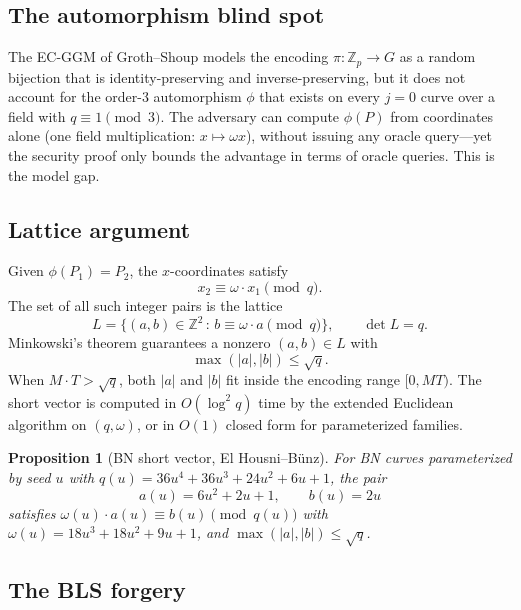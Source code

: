 \documentclass[11pt,a4paper]{article}
\newtheorem{proposition}[theorem]{Proposition}
\theoremstyle{definition}
\newcommand{\Z}{\mathbb{Z}}
\begin{document}
\subsection{The automorphism blind spot}

The EC-GGM of Groth–Shoup models the encoding $\pi : \Z_p \to G$ as a random
bijection that is identity-preserving and inverse-preserving, but it does
not account for the order-3 automorphism $\phi$ that exists on every $j=0$
curve over a field with $q \equiv 1 \pmod 3$. The adversary can compute
$\phi(P)$ from coordinates alone (one field multiplication: $x \mapsto \omega
x$), without issuing any oracle query—yet the security proof only bounds
the advantage in terms of oracle queries. This is the model gap.

\subsection{Lattice argument}

Given $\phi(P_1) = P_2$, the $x$-coordinates satisfy
\[
  x_2 \equiv \omega \cdot x_1 \pmod q.
\]
The set of all such integer pairs is the lattice
\[
  L = \{(a,b) \in \Z^2 \,:\, b \equiv \omega\cdot a \pmod q\},
  \qquad \det L = q.
\]
Minkowski's theorem guarantees a nonzero $(a,b) \in L$ with
\[
  \max(|a|,|b|) \le \sqrt{q}.
\]
When $M \cdot T > \sqrt{q}$, both $|a|$ and $|b|$ fit inside the encoding
range $[0, MT)$. The short vector is computed in $O(\log^2 q)$ time by the
extended Euclidean algorithm on $(q, \omega)$, or in $O(1)$ closed form for
parameterized families.

\begin{proposition}[BN short vector, El Housni--Bünz]
For BN curves parameterized by seed $u$ with $q(u) = 36u^4 + 36u^3 + 24u^2 +
6u + 1$, the pair
\[
  a(u) = 6u^2 + 2u + 1, \qquad b(u) = 2u
\]
satisfies $\omega(u) \cdot a(u) \equiv b(u) \pmod{q(u)}$ with
$\omega(u) = 18u^3 + 18u^2 + 9u + 1$, and $\max(|a|,|b|) \le \sqrt{q}$.
\end{proposition}

\subsection{The BLS forgery}
\end{document}
